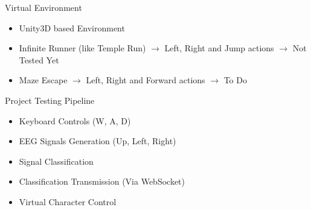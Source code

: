 \begin{frame}{Virtual Environment}
\begin{itemize}
    \item Unity3D based Environment
    \item Infinite Runner (like Temple Run) $\rightarrow{}$ Left, Right and Jump actions $\rightarrow{}$ Not Tested Yet
    \item Maze Escape $\rightarrow{}$ Left, Right and Forward actions $\rightarrow{}$ To Do
\end{itemize}
\end{frame}

\begin{frame}{Project Testing Pipeline}
    \begin{itemize}
        \item Keyboard Controls (W, A, D)
        \item EEG Signals Generation (Up, Left, Right)
        \item Signal Classification
        \item Classification Transmission (Via WebSocket)
        \item Virtual Character Control
    \end{itemize}
\end{frame}